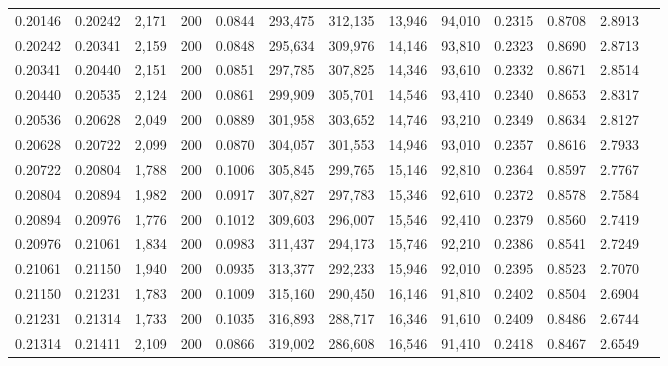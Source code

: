 \begin{tabular}{rrrrrrrrrrrrr}
0.20146 & 0.20242 &  2,171 & 200 &                                     0.0844 & 293,475 & 312,135 &  13,946 &  94,010 & 0.2315 & 0.8708 & 2.8913 \\
0.20242 & 0.20341 &  2,159 & 200 &                                     0.0848 & 295,634 & 309,976 &  14,146 &  93,810 & 0.2323 & 0.8690 & 2.8713 \\
0.20341 & 0.20440 &  2,151 & 200 &                                     0.0851 & 297,785 & 307,825 &  14,346 &  93,610 & 0.2332 & 0.8671 & 2.8514 \\
0.20440 & 0.20535 &  2,124 & 200 &                                     0.0861 & 299,909 & 305,701 &  14,546 &  93,410 & 0.2340 & 0.8653 & 2.8317 \\
0.20536 & 0.20628 &  2,049 & 200 &                                     0.0889 & 301,958 & 303,652 &  14,746 &  93,210 & 0.2349 & 0.8634 & 2.8127 \\
0.20628 & 0.20722 &  2,099 & 200 &                                     0.0870 & 304,057 & 301,553 &  14,946 &  93,010 & 0.2357 & 0.8616 & 2.7933 \\
0.20722 & 0.20804 &  1,788 & 200 &                                     0.1006 & 305,845 & 299,765 &  15,146 &  92,810 & 0.2364 & 0.8597 & 2.7767 \\
0.20804 & 0.20894 &  1,982 & 200 &                                     0.0917 & 307,827 & 297,783 &  15,346 &  92,610 & 0.2372 & 0.8578 & 2.7584 \\
0.20894 & 0.20976 &  1,776 & 200 &                                     0.1012 & 309,603 & 296,007 &  15,546 &  92,410 & 0.2379 & 0.8560 & 2.7419 \\
0.20976 & 0.21061 &  1,834 & 200 &                                     0.0983 & 311,437 & 294,173 &  15,746 &  92,210 & 0.2386 & 0.8541 & 2.7249 \\
0.21061 & 0.21150 &  1,940 & 200 &                                     0.0935 & 313,377 & 292,233 &  15,946 &  92,010 & 0.2395 & 0.8523 & 2.7070 \\
0.21150 & 0.21231 &  1,783 & 200 &                                     0.1009 & 315,160 & 290,450 &  16,146 &  91,810 & 0.2402 & 0.8504 & 2.6904 \\
0.21231 & 0.21314 &  1,733 & 200 &                                     0.1035 & 316,893 & 288,717 &  16,346 &  91,610 & 0.2409 & 0.8486 & 2.6744 \\
0.21314 & 0.21411 &  2,109 & 200 &                                     0.0866 & 319,002 & 286,608 &  16,546 &  91,410 & 0.2418 & 0.8467 & 2.6549 \\

\end{tabular}
